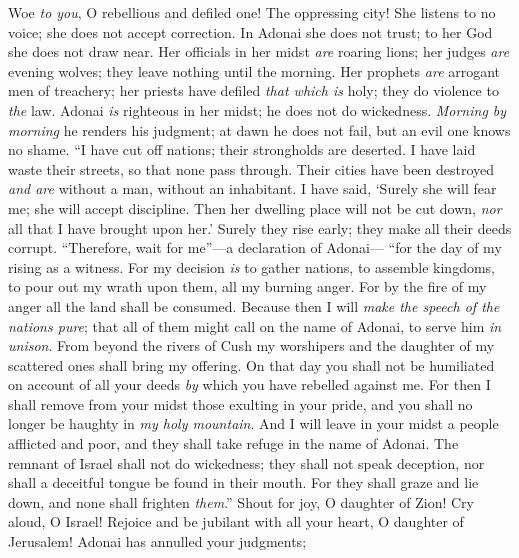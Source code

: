 \begin{biblechapter} %
 Woe \textit{to you}, O rebellious and defiled one! 
The oppressing city!
\verse She listens to no voice; 
she does not accept correction. 
In Adonai she does not trust; 
to her God she does not draw near.
\verse Her officials in her midst \textit{are} roaring lions; 
her judges \textit{are} evening wolves; 
they leave nothing until the morning.
\verse Her prophets \textit{are} arrogant men of treachery; 
her priests have defiled \textit{that which is} holy; 
they do violence to \textit{the} law.
\verse Adonai \textit{is} righteous in her midst; 
he does not do wickedness. 
\textit{Morning by morning} he renders his judgment; 
at dawn he does not fail, 
but an evil one knows no shame.
\verse “I have cut off nations; 
their strongholds are deserted. 
I have laid waste their streets, 
so that none pass through. 
Their cities have been destroyed 
\textit{and are} without a man, without an inhabitant.
\verse I have said, ‘Surely she will fear me; 
she will accept discipline. 
Then her dwelling place will not be cut down, 
\textit{nor} all that I have brought upon her.’ 
Surely they rise early; 
they make all their deeds corrupt.
\verse “Therefore, wait for me”—a declaration of Adonai— 
“for the day of my rising as a witness. 
For my decision \textit{is} to gather nations, 
to assemble kingdoms, 
to pour out my wrath upon them, all my burning anger. 
For by the fire of my anger all the land shall be consumed.
\verse Because then I will \textit{make the speech of the nations pure}; 
that all of them might call on the name of Adonai, 
to serve him \textit{in unison}.
\verse From beyond the rivers of Cush 
my worshipers and the daughter of my scattered ones 
shall bring my offering.
\verse On that day you shall not be humiliated 
on account of all your deeds 
\textit{by} which you have rebelled against me. 
For then I shall remove from your midst 
those exulting in your pride, 
and you shall no longer be haughty 
in \textit{my holy mountain}.
\verse And I will leave in your midst 
a people afflicted and poor, 
and they shall take refuge 
in the name of Adonai.
\verse The remnant of Israel 
shall not do wickedness; 
they shall not speak deception, 
nor shall a deceitful tongue be found in their mouth. 
For they shall graze and lie down, 
and none shall frighten \textit{them}.”
\verse Shout for joy, O daughter of Zion! 
Cry aloud, O Israel! 
Rejoice and be jubilant with all your heart, 
O daughter of Jerusalem!
\verse Adonai has annulled your judgments; 

\end{biblechapter}
